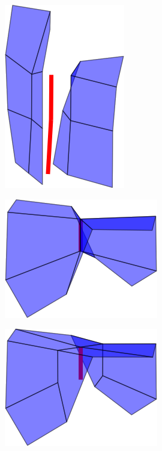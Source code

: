 \begin{figure}
\begin{center}
\begin{subfigure}[b]{.45\textwidth}
\includegraphics[height = .17\textheight, width = .5\textwidth,keepaspectratio]{Pictures/SurfaceReconstruction/3DManifoldMIRes}
\end{subfigure}
\begin{subfigure}[b]{.45\textwidth}
\centering
\includegraphics[height = .17\textheight, width = .5\textwidth,keepaspectratio]{Pictures/SurfaceReconstruction/3DManifoldOI}
\end{subfigure}
\begin{subfigure}[b]{.45\textwidth}
\centering
\includegraphics[height = .17\textheight, width = .5\textwidth,keepaspectratio]{Pictures/SurfaceReconstruction/3DManifoldOIRes}

\end{subfigure}
\end{center}
\end{figure}
